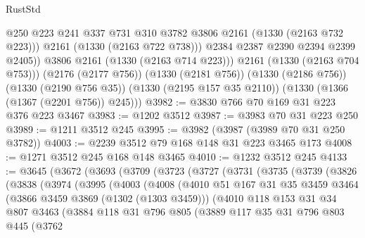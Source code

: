 \begin{lexlean}{RustStd}
\begin{coremodule}
                  @250
                  @223
                  @241
                  @337
                  @731
                  @310
                  @3782
                  @3806
                  @2161
                  (@1330 (@2163 @732 @223)))
                @2161
                (@1330 (@2163 @722 @738)))
              @2384
              @2387
              @2390
              @2394
              @2399
              @2405))
          @3806
          @2161
          (@1330 (@2163 @714 @223)))
        @2161
        (@1330 (@2163 @704 @753)))
      (@2176 (@2177 @756))
      (@1330 (@2181 @756))
      (@1330 (@2186 @756))
      (@1330 (@2190 @756 @35))
      (@1330 (@2195 @157 @35 @2110))
      (@1330 (@1366 (@1367 (@2201 @756)) @245)))
@3982 := @3830 @766 @70 @169 @31 @223 @376 @223 @3467
@3983 := @1202 @3512
@3987 := @3983 @70 @31 @223 @250
@3989 := @1211 @3512 @245
@3995 := @3982 (@3987 (@3989 @70 @31 @250 @3782))
@4003 := @2239 @3512 @79 @168 @148 @31 @223 @3465 @173
@4008 := @1271 @3512 @245 @168 @148 @3465
@4010 := @1232 @3512 @245
@4133 := @3645
    (@3672
      (@3693
        (@3709
          (@3723
            (@3727
              (@3731
                (@3735
                  (@3739
                    (@3826
                      (@3838
                        (@3974
                          (@3995
                            (@4003
                              (@4008
                                (@4010
                                  @51
                                  @167
                                  @31
                                  @35
                                  @3459
                                  @3464
                                  (@3866 @3459 @3869 (@1302 (@1303 @3459)))
                                  (@4010
                                    @118
                                    @153
                                    @31
                                    @34
                                    @807
                                    @3463
                                    (@3884
                                      @118
                                      @31
                                      @796
                                      @805
                                      (@3889
                                        @117
                                        @35
                                        @31
                                        @796
                                        @803
                                        @445
                                        (@3762

\end{coremodule}
\end{lexlean}
